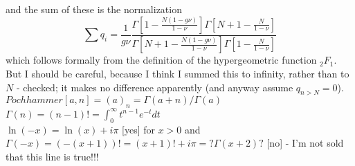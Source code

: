 and the sum of these is the normalization
\begin{equation*}
\sum q_i = \frac{1}{g\nu} \frac{\Gamma[1-\frac{N(1-g\nu)}{1-\nu}]\Gamma[N+1-\frac{N}{1-\nu}]}{\Gamma[N+1-\frac{N(1-g\nu)}{1-\nu}]\Gamma[1-\frac{N}{1-\nu}]}
\end{equation*}
which follows formally from the definition of the hypergeometric function $_2F_1$. 
\iffalse
But I should be careful, because I think I summed this to infinity, rather than to $N$ - checked; it makes no difference apparently (and anyway assume $q_{n>N}=0$). \\
$Pochhammer[a,n] = (a)_n = \Gamma(a+n)/\Gamma(a)$ \\
$\Gamma(n) = (n-1)! = \int_0^\infty t^{n-1}e^{-t}dt$ \\
$\ln(-x)=\ln(x)+i\pi$ [yes] for $x>0$ and $\Gamma(-x)=(-(x+1))!=(x+1)!+i\pi=?\Gamma(x+2)?$ [no] - I'm not sold that this line is true!!! \\
